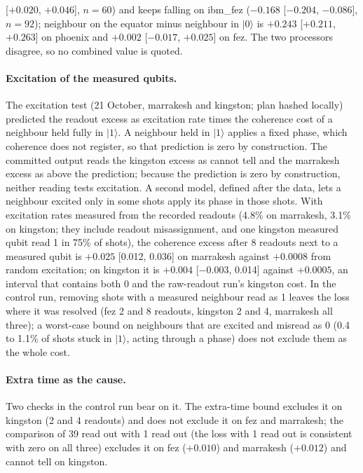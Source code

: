 \documentclass[reprint,amsmath,amssymb,aps,superscriptaddress,nofootinbib]{revtex4-2}
\begin{document}
[$+0.020$, $+0.046$], $n=60$) and keeps falling on ibm\_fez ($-0.168$ [$-0.204$, $-0.086$], $n=92$); neighbour on the equator minus neighbour in $|0\rangle$ is $+0.243$ [$+0.211$, $+0.263$] on phoenix and $+0.002$ [$-0.017$, $+0.025$] on fez. The two processors disagree, so no combined value is quoted.

\paragraph*{Excitation of the measured qubits.} The excitation test (21 October, marrakesh and kingston; plan hashed locally) predicted the readout excess as excitation rate times the coherence cost of a neighbour held fully in $|1\rangle$. A neighbour held in $|1\rangle$ applies a fixed phase, which coherence does not register, so that prediction is zero by construction. The committed output reads the kingston excess as cannot tell and the marrakesh excess as above the prediction; because the prediction is zero by construction, neither reading tests excitation. A second model, defined after the data, lets a neighbour excited only in some shots apply its phase in those shots. With excitation rates measured from the recorded readouts (4.8\% on marrakesh, 3.1\% on kingston; they include readout misassignment, and one kingston measured qubit read 1 in 75\% of shots), the coherence excess after 8 readouts next to a measured qubit is $+0.025$ [0.012, 0.036] on marrakesh against $+0.0008$ from random excitation; on kingston it is $+0.004$ [$-0.003$, 0.014] against $+0.0005$, an interval that contains both 0 and the raw-readout run's kingston cost. In the control run, removing shots with a measured neighbour read as 1 leaves the loss where it was resolved (fez 2 and 8 readouts, kingston 2 and 4, marrakesh all three); a worst-case bound on neighbours that are excited and misread as 0 (0.4 to 1.1\% of shots stuck in $|1\rangle$, acting through a phase) does not exclude them as the whole cost.

\paragraph*{Extra time as the cause.} Two checks in the control run bear on it. The extra-time bound excludes it on kingston (2 and 4 readouts) and does not exclude it on fez and marrakesh; the comparison of 39 read out with 1 read out (the loss with 1 read out is consistent with zero on all three) excludes it on fez ($+0.010$) and marrakesh ($+0.012$) and cannot tell on kingston.
\end{document}
